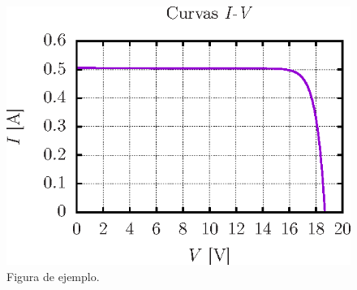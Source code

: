 \documentclass{article}
\begin{document}
	
	\lipsum[1-2]
	\begin{figure}[h]
		\centering
		\includegraphics[]{iv}
		\caption{Figura de ejemplo.}
	\end{figure}

\lipsum[1]
\end{document}
